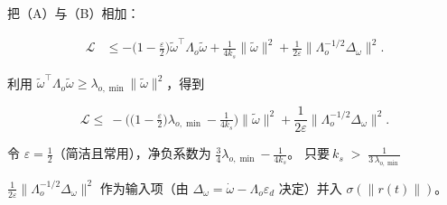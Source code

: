 \documentclass[pdflatex,sn-mathphys-num]{sn-jnl}%
\theoremstyle{thmstyleone}%
\theoremstyle{thmstyletwo}%
\theoremstyle{thmstylethree}%
\begin{document}
把（A）与（B）相加：

$$
\begin{aligned}
	\mathcal{L}
&\le
-\Big(1-\tfrac{\varepsilon}{2}\Big)\tilde\omega^\top\Lambda_o\tilde\omega
+\frac{1}{4k_s}\|\tilde\omega\|^2
+\frac{1}{2\varepsilon}\big\|\Lambda_o^{-1/2}\Delta_\omega\big\|^2.
\end{aligned}
$$

利用 $\tilde\omega^\top\Lambda_o\tilde\omega\ge \lambda_{o,\min}\|\tilde\omega\|^2$，得到

$$
\mathcal{L} \le\
-\Big(\big(1-\tfrac{\varepsilon}{2}\big)\lambda_{o,\min}-\tfrac{1}{4k_s}\Big)\|\tilde\omega\|^2
+\frac{1}{2\varepsilon}\big\|\Lambda_o^{-1/2}\Delta_\omega\big\|^2.
$$

令 $\varepsilon=\tfrac12$（简洁且常用），净负系数为 $\tfrac{3}{4}\lambda_{o,\min}-\tfrac{1}{4k_s}$。
只要$
\boxed{ \ k_s\;>\;\frac{1}{3\,\lambda_{o,\min}}\ }$

 $\frac{1}{2\varepsilon}\|\Lambda_o^{-1/2}\Delta_\omega\|^2$ 作为输入项（由 $\Delta_\omega=\dot\omega-\Lambda_o\varepsilon_d$ 决定）并入 $\sigma(\|r(t)\|)$。





\end{document}
